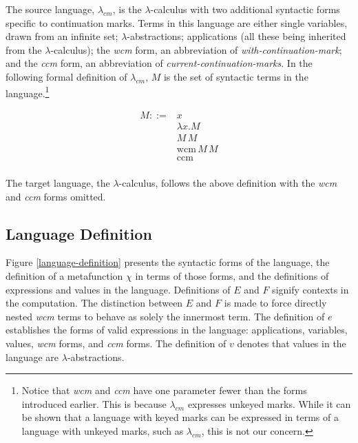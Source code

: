 \documentclass[ms]{byuprop}
\newcounter{definition}
\begin{document}
The source language, $\lambda_{cm}$, is the $\lambda$-calculus with two additional syntactic forms specific to continuation marks. Terms in this language are either single variables, drawn from an infinite set; $\lambda$-abstractions; applications (all these being inherited from the $\lambda$-calculus); the \emph{wcm} form, an abbreviation of \emph{with-continuation-mark}; and the \emph{ccm} form, an abbreviation of \emph{current-continuation-marks}. In the following formal definition of $\lambda_{cm}$, $M$ is the set of syntactic terms in the language.\footnote{Notice that \emph{wcm} and \emph{ccm} have one parameter fewer than the forms introduced earlier. This is because $\lambda_{cm}$ expresses unkeyed marks. While it can be shown that a language with keyed marks can be expressed in terms of a language with unkeyed marks, such as $\lambda_{cm}$, this is not our concern.}

\begin{align*}
M ::= &x\\
      &\lambda x.M\\
      &M\,M\\
      &\mathrm{wcm}\,M\,M\\
      &\mathrm{ccm}\\
\end{align*}

The target language, the $\lambda$-calculus, follows the above definition with the \emph{wcm} and \emph{ccm} forms omitted.









\subsection{Language Definition}

Figure \ref{language-definition} presents the syntactic forms of the language, the 
definition of a metafunction $\chi$ in terms of those forms, and the definitions of 
expressions and values in the language. Definitions of $E$ and $F$ signify contexts in the 
computation. The distinction between $E$ and $F$ is made to force directly nested 
\emph{wcm} terms to behave as solely the innermost term. The definition of $e$ establishes 
the forms of valid expressions in the language: applications, variables, values, \emph{wcm} 
forms, and \emph{ccm} forms. The definition of $v$ denotes that values in the language 
are $\lambda$-abstractions.
\end{document}
